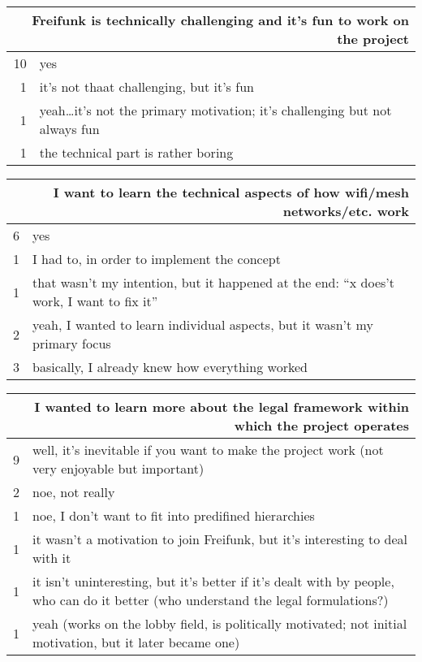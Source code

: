 \begin{table}[h]
  \begin{tabular}{| r | p{\textwidth} |}
    \hline
    \multicolumn{2}{|p{\textwidth}|}{Freifunk is technically challenging and it's fun to work on the project} \\
    \hline
    10 & yes \\
    1  & it's not thaat challenging, but it's fun \\
    1  & yeah\ldots it's not the primary motivation; it's challenging but not always fun \\
    1  & the technical part is rather boring \\
    \hline
  \end{tabular}
\end{table}

\begin{table}[h]
  \begin{tabular}{| r | p{\textwidth} |}
    \hline
    \multicolumn{2}{|p{\textwidth}|}{I want to learn the technical aspects of how wifi/mesh networks/etc. work} \\
    \hline
    6 & yes \\
    1 & I had to, in order to implement the concept \\
    1 & that wasn't my intention, but it happened at the end: ``x does't work, I want to fix it'' \\
    2 & yeah, I wanted to learn individual aspects, but it wasn't my primary focus \\
    3 & basically, I already knew how everything worked \\
    \hline
  \end{tabular}
\end{table}

\begin{table}[h]
  \begin{tabular}{| r | p{\textwidth} |}
    \hline
    \multicolumn{2}{|p{\textwidth}|}{I wanted to learn more about the legal framework within which the project operates} \\
    \hline
    9 & well, it's inevitable if you want to make the project work (not very enjoyable but important) \\
    2 & noe, not really \\
    1 & noe, I don't want to fit into predifined hierarchies \\
    1 & it wasn't a motivation to join Freifunk, but it's interesting to deal with it \\
    1 & it isn't uninteresting, but it's better if it's dealt with by people, who can do it better (who understand the legal formulations?) \\
    1 & yeah (works on the lobby field, is politically motivated; not initial motivation, but it later became one) \\
    \hline
  \end{tabular}
\end{table}

